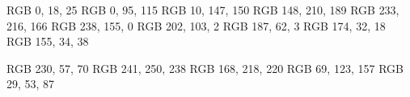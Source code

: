 
\definecolor{richBlackFOGRA}  {RGB} {  0,  18,  25}
\definecolor{blueSapphire}    {RGB} {  0,  95, 115}
\definecolor{viridianGreen}   {RGB} { 10, 147, 150}
\definecolor{middleBlueGreen} {RGB} {148, 210, 189}
\definecolor{mediumChampagne} {RGB} {233, 216, 166}
\definecolor{gamboge}         {RGB} {238, 155,   0}
\definecolor{alloyOrange}     {RGB} {202, 103,   2}
\definecolor{mahogany}        {RGB} {187,  62,   3}
\definecolor{rufous}          {RGB} {174,  32,  18}
\definecolor{rubyRed}         {RGB} {155,  34,  38}


\definecolor{imperialRed}  {RGB} {230,  57,  70}
\definecolor{honeydew}     {RGB} {241, 250, 238}
\definecolor{powderBlue}   {RGB} {168, 218, 220}
\definecolor{celadonBlue}  {RGB} { 69, 123, 157}
\definecolor{prussianBlue} {RGB} { 29,  53,  87}
